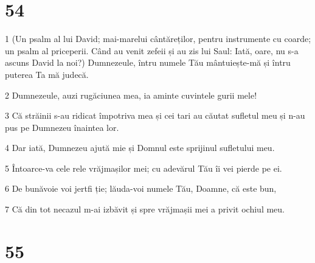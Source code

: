 \chapter{54}

\par 1 (Un psalm al lui David; mai-marelui cântăreților, pentru instrumente cu coarde; un psalm al priceperii. Când au venit zefeii și au zis lui Saul: Iată, oare, nu s-a ascuns David la noi?) Dumnezeule, întru numele Tău mântuiește-mă și întru puterea Ta mă judecă.
\par 2 Dumnezeule, auzi rugăciunea mea, ia aminte cuvintele gurii mele!
\par 3 Că străinii s-au ridicat împotriva mea și cei tari au căutat sufletul meu și n-au pus pe Dumnezeu înaintea lor.
\par 4 Dar iată, Dumnezeu ajută mie și Domnul este sprijinul sufletului meu.
\par 5 Întoarce-va cele rele vrăjmașilor mei; cu adevărul Tău îi vei pierde pe ei.
\par 6 De bunăvoie voi jertfi ție; lăuda-voi numele Tău, Doamne, că este bun,
\par 7 Că din tot necazul m-ai izbăvit și spre vrăjmașii mei a privit ochiul meu.

\chapter{55}

